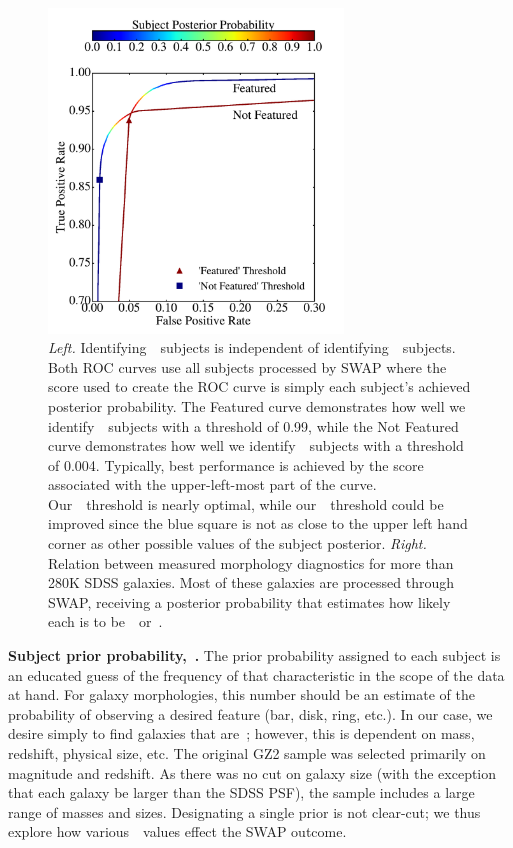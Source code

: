 \begin{figure}[t!]
\includegraphics[width=3.08in]{Figures/human_machine/A2a.pdf}
\caption{\textit{Left.} Identifying~\feat~subjects is independent of identifying~\notfeat~subjects.  Both ROC curves use all subjects processed by SWAP where the score used to create the ROC curve is simply each subject's achieved posterior probability. The Featured curve demonstrates how well we identify~\feat~subjects with a threshold of 0.99, while the Not Featured curve demonstrates how well we identify~\notfeat~subjects with a threshold of 0.004. Typically, best performance is achieved by the score associated with the upper-left-most part of the curve. Our~\feat~threshold is nearly optimal, while our~\notfeat~threshold could be improved since the blue square is not as close to the upper left hand corner as other possible values of the subject posterior. \textit{Right.} Relation between measured morphology diagnostics for more than 280K SDSS galaxies. Most of these galaxies are processed through SWAP, receiving a posterior probability that estimates how likely each is to be~\feat~or~\notfeat.}
\label{fig: morph thresh}
\end{figure}


\textbf{Subject prior probability,~\p.}
The prior probability assigned to each subject is an educated guess of 
the frequency of that characteristic in the scope of the data at hand. 
For galaxy morphologies, this number should be an estimate of the probability
of observing a desired feature (bar, disk, ring, etc.). In our case, 
we desire simply to find galaxies that are~\feat; however, this is dependent 
on mass, redshift, physical size, etc. The original GZ2 sample was selected
primarily on magnitude and redshift.  As there was no cut on galaxy size
(with the exception that each galaxy be larger than the SDSS PSF), the sample
includes a large range of  masses and sizes. Designating a single prior is not clear-cut; 
we thus explore how various~\p~values effect the SWAP outcome.

